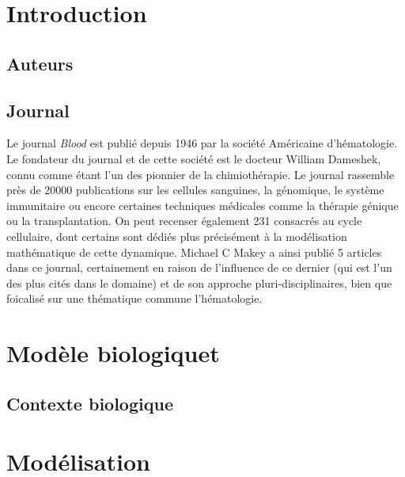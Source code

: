 \documentclass[fleqn,10pt]{SelfArx}
\begin{document}
\flushbottom %

\maketitle %

\thispagestyle{empty} %


\section*{Introduction} 

\subsection*{Auteurs}
\subsection*{Journal}  
Le journal \textit{Blood} est publié depuis 1946 par la société Américaine d'hématologie. Le fondateur du journal et de cette société est le docteur William Dameshek, connu comme étant l'un des pionnier de la chimiothérapie. Le journal rassemble près de 20000 publications sur les cellules sanguines, la génomique, le système immunitaire ou encore certaines techniques médicales comme la thérapie génique ou la transplantation. On peut recenser également 231 consacrés au cycle cellulaire, dont certains sont dédiés plus précisément à la modélisation mathématique de cette dynamique. Michael C Makey a ainsi publié 5 articles dans ce journal, certainement en raison de l'influence de ce dernier (qui est l'un des plus cités dans le domaine) et de son approche pluri-disciplinaires, bien que foicalisé sur une thématique commune l'hématologie.
\section*{Modèle biologiquet} 



\subsection*{Contexte biologique}
\section*{Modélisation}
\end{document}
